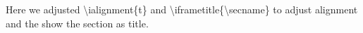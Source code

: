 \begingroup
\renewcommand{\ialignment}{t}
\renewcommand{\iframetitle}{\secname}
\begin{iframe}[-10pt]
	Here we adjusted \textbackslash ialignment\{t\} and \textbackslash iframetitle\{\textbackslash secname\} to adjust alignment and the show the section as title.
\end{iframe}
\endgroup